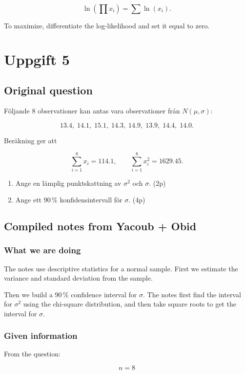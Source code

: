 \documentclass[10pt]{article}
\begin{document}
\[
\ln\left(\prod x_i\right)
=
\sum \ln(x_i).
\]

To maximize, differentiate the log-likelihood and set it equal to zero.

\section*{Uppgift 5}

\subsection*{Original question}
Följande 8 observationer kan antas vara observationer från
$N(\mu,\sigma)$:

\[
13.4,\;14.1,\;15.1,\;14.3,\;14.9,\;13.9,\;14.4,\;14.0.
\]

Beräkning ger att

\[
\sum_{i=1}^{8} x_i=114.1,
\qquad
\sum_{i=1}^{8} x_i^2=1629.45.
\]

\begin{enumerate}[label=\alph*)]
\item
Ange en lämplig punktskattning av $\sigma^2$ och $\sigma$.
\hfill (2p)

\item
Ange ett $90\,\%$ konfidensintervall för $\sigma$.
\hfill (4p)
\end{enumerate}

\subsection*{Compiled notes from Yacoub + Obid}

\subsubsection*{What we are doing}
The notes use descriptive statistics for a normal sample.
First we estimate the variance and standard deviation from the sample.

Then we build a $90\,\%$ confidence interval for $\sigma$.
The notes first find the interval for $\sigma^2$ using the
chi-square distribution, and then take square roots to get the
interval for $\sigma$.

\subsubsection*{Given information}
From the question:

\[
n=8
\]
\end{document}

